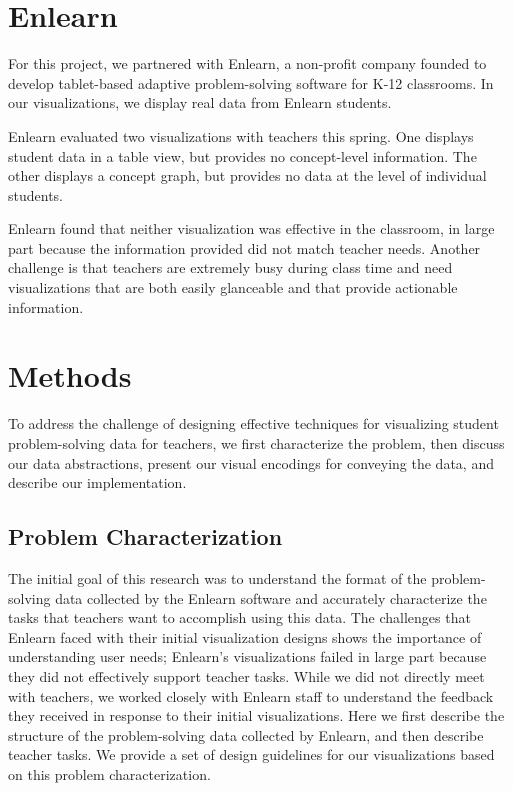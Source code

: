 \documentclass{sigchi}
\begin{document}
\section{Enlearn}
For this project, we partnered with Enlearn, a non-profit company founded to develop tablet-based adaptive problem-solving software for K-12 classrooms. In our visualizations, we display real data from Enlearn students.

Enlearn evaluated two visualizations with teachers this spring. One displays student data in a table view, but provides no concept-level information. The other displays a concept graph, but provides no data at the level of individual students.

Enlearn found that neither visualization was effective in the classroom, in large part because the information provided did not match teacher needs. Another challenge is that teachers are extremely busy during class time and need visualizations that are both easily glanceable and that provide actionable information.




\section{Methods}
To address the challenge of designing effective techniques for visualizing student problem-solving data for teachers, we first characterize the problem, then discuss our data abstractions, present our visual encodings for conveying the data, and describe our implementation.


\subsection{Problem Characterization}
The initial goal of this research was to understand the format of the problem-solving data collected by the Enlearn software and accurately characterize the tasks that teachers want to accomplish using this data. The challenges that Enlearn faced with their initial visualization designs shows the importance of understanding user needs; Enlearn's visualizations failed in large part because they did not effectively support teacher tasks. While we did not directly meet with teachers, we worked closely with Enlearn staff to understand the feedback they received in response to their initial visualizations. Here we first describe the structure of the problem-solving data collected by Enlearn, and then describe teacher tasks. We provide a set of design guidelines for our visualizations based on this problem characterization.
\end{document}
